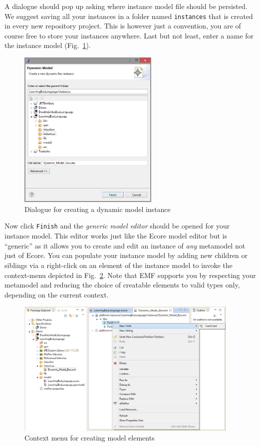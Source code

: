 A dialogue should pop up asking where instance model file should be persisted.
We suggest saving all your instances in a folder named \texttt{instances} that is created in every new repository project.
This is however just a convention, you are of course free to store your instances anywhere.
Last but not least, enter a name for the instance model (Fig.~\ref{fig:store_dynamic_instance}).

\begin{figure}[htbp]
	\centering
  \includegraphics[width=0.6\textwidth]{pics/modelBrowserBilder/persistDialog.png}
	\caption{Dialogue for creating a dynamic model instance}
	\label{fig:store_dynamic_instance}
\end{figure}

Now click \texttt{Finish} and the \emph{generic model editor} should be opened for your instance model.
This editor works just like the Ecore model editor but is ``generic'' as it allows you to create and edit an instance of \emph{any} metamodel not just of Ecore.
You can populate your instance model by adding new children or siblings via a right-click on an element of the instance model to invoke the context-menu depicted in Fig.~\ref{fig:create_instance}.
Note that EMF supports you by respecting your metamodel and reducing the choice of creatable elements to valid types only, depending on the current context.

\begin{figure}[htbp]
	\centering
  \includegraphics[width=0.95\textwidth]{pics/modelBrowserBilder/adjustModel.png}
	\caption{Context menu for creating model elements}
	\label{fig:create_instance}
\end{figure}

